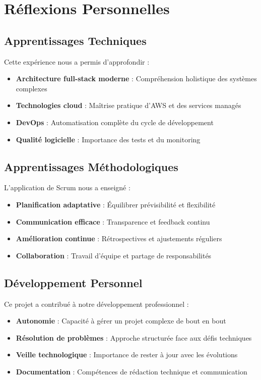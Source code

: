 \section{Réflexions Personnelles}

\subsection{Apprentissages Techniques}

Cette expérience nous a permis d'approfondir :

\begin{itemize}
    \item \textbf{Architecture full-stack moderne} : Compréhension holistique des systèmes complexes
    \item \textbf{Technologies cloud} : Maîtrise pratique d'AWS et des services managés
    \item \textbf{DevOps} : Automatisation complète du cycle de développement
    \item \textbf{Qualité logicielle} : Importance des tests et du monitoring
\end{itemize}

\subsection{Apprentissages Méthodologiques}

L'application de Scrum nous a enseigné :

\begin{itemize}
    \item \textbf{Planification adaptative} : Équilibrer prévisibilité et flexibilité
    \item \textbf{Communication efficace} : Transparence et feedback continu
    \item \textbf{Amélioration continue} : Rétrospectives et ajustements réguliers
    \item \textbf{Collaboration} : Travail d'équipe et partage de responsabilités
\end{itemize}

\subsection{Développement Personnel}

Ce projet a contribué à notre développement professionnel :

\begin{itemize}
    \item \textbf{Autonomie} : Capacité à gérer un projet complexe de bout en bout
    \item \textbf{Résolution de problèmes} : Approche structurée face aux défis techniques
    \item \textbf{Veille technologique} : Importance de rester à jour avec les évolutions
    \item \textbf{Documentation} : Compétences de rédaction technique et communication
\end{itemize}

